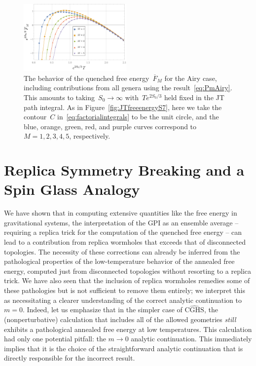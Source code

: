 \documentclass[12pt]{article}
\begin{document}
\begin{figure}[t]
\centering
\includegraphics[width=0.49\textwidth]{Airy_Free_Energy_varyM}
\caption{The behavior of the quenched free energy~$\overline{F}_M$ for the Airy case, including contributions from all genera using the result~\eqref{eq:PmAiry}.  This amounts to taking~$S_0 \to \infty$ with~$T e^{2S_0/3}$ held fixed in the JT path integral.  As in Figure~\ref{fig:JTfreeenergyS7}, here we take the contour~$C$ in~\eqref{eq:factorialintegrals} to be the unit circle, and the blue, orange, green, red, and purple curves correspond to~$M = 1,2,3,4,5$, respectively.}
\label{fig:Airyfree}
\end{figure}


\section{Replica Symmetry Breaking and a Spin Glass Analogy}
\label{sec:RSB}

We have shown that in computing extensive quantities like the free energy in gravitational systems, the interpretation of the GPI as an ensemble average -- requiring a replica trick for the computation of the quenched free energy -- can lead to a contribution from replica wormholes that exceeds that of disconnected topologies.  The necessity of these corrections can already be inferred from the pathological properties of the low-temperature behavior of the annealed free energy, computed just from disconnected topologies without resorting to a replica trick.  We have also seen that the inclusion of replica wormholes remedies some of these pathologies but is not sufficient to remove them entirely; we interpret this as necessitating a clearer understanding of the correct analytic continuation to~$m = 0$. Indeed, let us emphasize that in the simpler case of $\widehat{\mathrm{CGHS}}$, the (nonperturbative) calculation that includes all of the allowed geometries \textit{still} exhibits a pathological annealed free energy at low temperatures.  This calculation had only one potential pitfall: the $m\rightarrow 0$ analytic continuation. This immediately implies that it is the  choice of the straightforward analytic continuation that is directly responsible for the incorrect result. 
\end{document}
